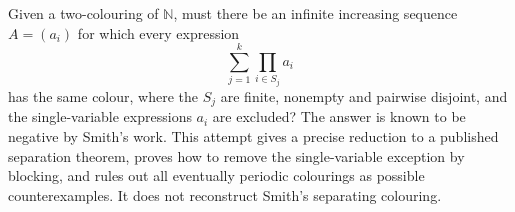 Given a two-colouring of $\mathbb N$, must there be an infinite increasing sequence $A=(a_i)$ for which every expression
\[
 \sum_{j=1}^k\prod_{i\in S_j}a_i
\]
has the same colour, where the $S_j$ are finite, nonempty and pairwise disjoint, and the single-variable expressions $a_i$ are excluded? The answer is known to be negative by Smith's work. This attempt gives a precise reduction to a published separation theorem, proves how to remove the single-variable exception by blocking, and rules out all eventually periodic colourings as possible counterexamples. It does not reconstruct Smith's separating colouring.
